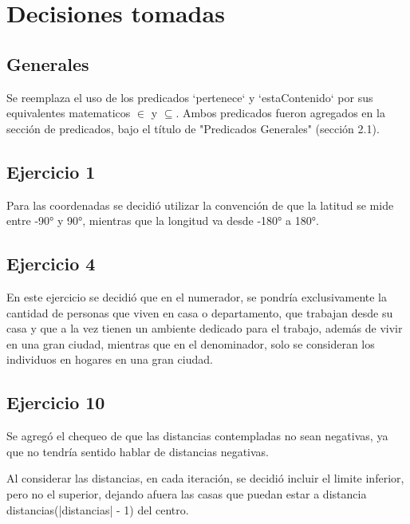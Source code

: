 \documentclass[a4paper]{article}
\begin{document}
\section{Decisiones tomadas}

\subsection{Generales}
Se reemplaza el uso de los predicados `pertenece` y `estaContenido` por sus equivalentes matematicos $\in$ y $\subseteq$.
Ambos predicados fueron agregados  en la sección de predicados, bajo el título de "Predicados Generales" (sección 2.1).

\subsection{Ejercicio 1}
Para las coordenadas se decidió utilizar la convención de que la latitud se mide entre -90° y 90°, mientras que la longitud va desde -180° a 180°.


\subsection{Ejercicio 4}
En este ejercicio se decidió que en el numerador, se pondría exclusivamente la cantidad de personas que viven en casa o departamento, que trabajan desde su casa y que a la vez tienen un ambiente dedicado para el trabajo, además de vivir en una gran ciudad, mientras que en el denominador, solo se consideran los individuos en hogares en una gran ciudad.

\subsection{Ejercicio 10}
Se agregó el chequeo de que las distancias contempladas no sean negativas, ya que no tendría sentido hablar de distancias negativas.

Al considerar las distancias, en cada iteración, se decidió incluir el limite inferior, pero no el superior, dejando afuera las casas que puedan estar a distancia distancias(|distancias| - 1) del centro.
\end{document}
